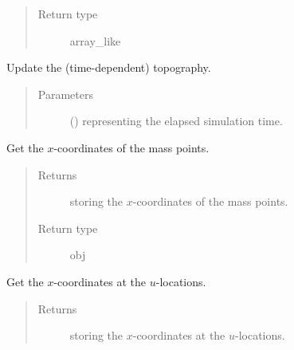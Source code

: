 \documentclass[letterpaper,10pt,english]{sphinxmanual}
\begin{document}
\begin{fulllineitems}
\begin{fulllineitems}
\begin{quote}
\begin{description}
\item[{Return type}] \leavevmode
array\_like

\end{description}\end{quote}

\end{fulllineitems}


\begin{fulllineitems}
\label{\detokenize{api:tasmania.grids.grid_xyz.GridXYZ.update_topography}}
Update the (time-dependent) topography.
\begin{quote}\begin{description}
\item[{Parameters}] \leavevmode
{} () \textendash{}  representing the elapsed simulation time.

\end{description}\end{quote}

\end{fulllineitems}


\begin{fulllineitems}
\label{\detokenize{api:tasmania.grids.grid_xyz.GridXYZ.x}}
Get the \(x\)-coordinates of the mass points.
\begin{quote}\begin{description}
\item[{Returns}] \leavevmode
{\hyperref[\detokenize{api:tasmania.grids.axis.Axis}]{}} storing the \(x\)-coordinates of the mass points.

\item[{Return type}] \leavevmode
obj

\end{description}\end{quote}

\end{fulllineitems}


\begin{fulllineitems}
\label{\detokenize{api:tasmania.grids.grid_xyz.GridXYZ.x_at_u_locations}}
Get the \(x\)-coordinates at the \(u\)-locations.
\begin{quote}\begin{description}
\item[{Returns}] \leavevmode
{\hyperref[\detokenize{api:tasmania.grids.axis.Axis}]{}} storing the \(x\)-coordinates at the \(u\)-locations.


\end{description}
\end{quote}
\end{fulllineitems}
\end{fulllineitems}
\end{document}
